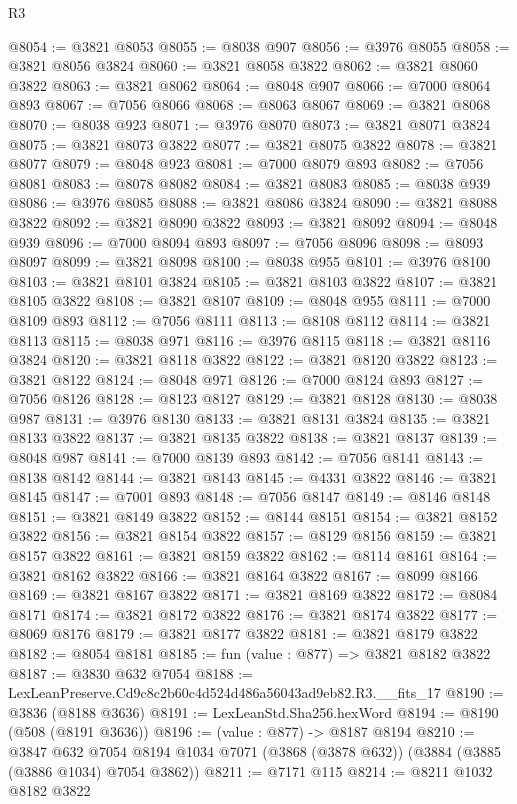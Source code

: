 \begin{lexlean}{R3}
\begin{coremodule}
@8054 := @3821 @8053
@8055 := @8038 @907
@8056 := @3976 @8055
@8058 := @3821 @8056 @3824
@8060 := @3821 @8058 @3822
@8062 := @3821 @8060 @3822
@8063 := @3821 @8062
@8064 := @8048 @907
@8066 := @7000 @8064 @893
@8067 := @7056 @8066
@8068 := @8063 @8067
@8069 := @3821 @8068
@8070 := @8038 @923
@8071 := @3976 @8070
@8073 := @3821 @8071 @3824
@8075 := @3821 @8073 @3822
@8077 := @3821 @8075 @3822
@8078 := @3821 @8077
@8079 := @8048 @923
@8081 := @7000 @8079 @893
@8082 := @7056 @8081
@8083 := @8078 @8082
@8084 := @3821 @8083
@8085 := @8038 @939
@8086 := @3976 @8085
@8088 := @3821 @8086 @3824
@8090 := @3821 @8088 @3822
@8092 := @3821 @8090 @3822
@8093 := @3821 @8092
@8094 := @8048 @939
@8096 := @7000 @8094 @893
@8097 := @7056 @8096
@8098 := @8093 @8097
@8099 := @3821 @8098
@8100 := @8038 @955
@8101 := @3976 @8100
@8103 := @3821 @8101 @3824
@8105 := @3821 @8103 @3822
@8107 := @3821 @8105 @3822
@8108 := @3821 @8107
@8109 := @8048 @955
@8111 := @7000 @8109 @893
@8112 := @7056 @8111
@8113 := @8108 @8112
@8114 := @3821 @8113
@8115 := @8038 @971
@8116 := @3976 @8115
@8118 := @3821 @8116 @3824
@8120 := @3821 @8118 @3822
@8122 := @3821 @8120 @3822
@8123 := @3821 @8122
@8124 := @8048 @971
@8126 := @7000 @8124 @893
@8127 := @7056 @8126
@8128 := @8123 @8127
@8129 := @3821 @8128
@8130 := @8038 @987
@8131 := @3976 @8130
@8133 := @3821 @8131 @3824
@8135 := @3821 @8133 @3822
@8137 := @3821 @8135 @3822
@8138 := @3821 @8137
@8139 := @8048 @987
@8141 := @7000 @8139 @893
@8142 := @7056 @8141
@8143 := @8138 @8142
@8144 := @3821 @8143
@8145 := @4331 @3822
@8146 := @3821 @8145
@8147 := @7001 @893
@8148 := @7056 @8147
@8149 := @8146 @8148
@8151 := @3821 @8149 @3822
@8152 := @8144 @8151
@8154 := @3821 @8152 @3822
@8156 := @3821 @8154 @3822
@8157 := @8129 @8156
@8159 := @3821 @8157 @3822
@8161 := @3821 @8159 @3822
@8162 := @8114 @8161
@8164 := @3821 @8162 @3822
@8166 := @3821 @8164 @3822
@8167 := @8099 @8166
@8169 := @3821 @8167 @3822
@8171 := @3821 @8169 @3822
@8172 := @8084 @8171
@8174 := @3821 @8172 @3822
@8176 := @3821 @8174 @3822
@8177 := @8069 @8176
@8179 := @3821 @8177 @3822
@8181 := @3821 @8179 @3822
@8182 := @8054 @8181
@8185 := fun (value : @877) => @3821 @8182 @3822
@8187 := @3830 @632 @7054
@8188 := LexLeanPreserve.Cd9c8c2b60c4d524d486a56043ad9eb82.R3.__fits_17
@8190 := @3836 (@8188 @3636)
@8191 := LexLeanStd.Sha256.hexWord
@8194 := @8190 (@508 (@8191 @3636))
@8196 := (value : @877) -> @8187 @8194
@8210 := @3847
    @632
    @7054
    @8194
    @1034
    @7071
    (@3868 (@3878 @632))
    (@3884 (@3885 (@3886 @1034) @7054 @3862))
@8211 := @7171 @115
@8214 := @8211 @1032 @8182 @3822

\end{coremodule}
\end{lexlean}
